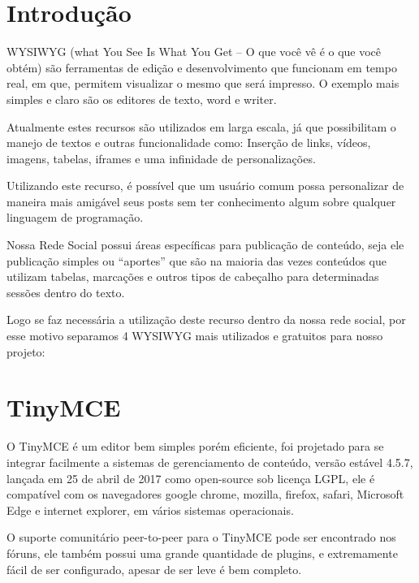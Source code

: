 \documentclass[12pt,a4paper]{article}
\begin{document}
\section{Introdução}

WYSIWYG (what You See Is What You Get – O que você vê é o que você obtém) são ferramentas de edição e desenvolvimento que funcionam em tempo real, em que, permitem visualizar o mesmo que será impresso. O exemplo mais simples e claro são os editores de texto, word e writer.

Atualmente estes recursos são utilizados em larga escala, já que possibilitam o manejo de textos e outras funcionalidade como: Inserção de links, vídeos, imagens, tabelas, iframes e uma infinidade de personalizações.

Utilizando este recurso, é possível que um usuário comum possa personalizar de maneira mais amigável seus posts sem ter conhecimento algum sobre qualquer linguagem de programação. 

Nossa Rede Social possui áreas específicas para publicação de conteúdo, seja ele publicação simples ou “aportes” que são na maioria das vezes conteúdos que utilizam tabelas, marcações e outros tipos de cabeçalho para determinadas sessões dentro do texto.

 Logo se faz necessária a utilização deste recurso dentro da nossa rede social, por esse motivo separamos 4 WYSIWYG mais utilizados e gratuitos para nosso projeto:


\section{TinyMCE}
O TinyMCE  é um editor bem simples porém eficiente, foi projetado para se integrar facilmente a sistemas de gerenciamento de conteúdo, versão estável 4.5.7, lançada em 25 de abril de 2017 como open-source sob licença LGPL, ele é compatível com os navegadores google chrome, mozilla, firefox, safari, Microsoft Edge e internet explorer, em vários sistemas operacionais.

O suporte comunitário peer-to-peer para o TinyMCE pode ser encontrado nos fóruns, ele também possui uma grande quantidade de  plugins, e extremamente fácil de ser configurado, apesar de ser leve é bem completo. 
\end{document}
